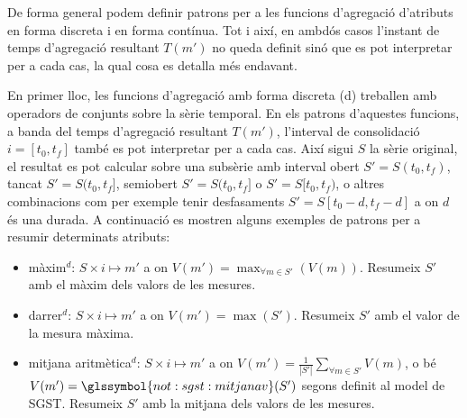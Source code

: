De forma general podem definir patrons per a les funcions d'agregació
d'atributs en forma discreta i en forma contínua. Tot i així, en
ambdós casos l'instant de temps d'agregació resultant $T(m')$ no queda
definit sinó que es pot interpretar per a cada cas, la qual cosa es detalla
més endavant.


En primer lloc, les funcions d'agregació amb forma discreta (d)
treballen amb operadors de conjunts sobre la sèrie temporal. En els
patrons d'aquestes funcions, a banda del temps d'agregació resultant
$T(m')$, l'interval de consolidació $i=[t_0,t_f]$ també es pot
interpretar per a cada cas. Així sigui $S$ la sèrie original, el
resultat es pot calcular sobre una subsèrie amb interval obert
$S'=S(t_0,t_f)$, tancat $S'=S(t_0,t_f]$, semiobert $S'=S(t_0,t_f]$ o
$S'=S[t_0,t_f)$, o altres combinacions com per exemple tenir
desfasaments $S'=S[t_0-d,t_f-d]$ a on $d$ és una durada. A continuació
es mostren alguns exemples de patrons per a resumir determinats
atributs:
\begin{itemize}
\item màxim$^d$: $S \times i \mapsto m'$ a on $V(m') = \max_{\forall m
    \in S'}(V(m))$. Resumeix $S'$ amb el màxim dels valors de les
  mesures.


\item darrer$^d$: $S \times i \mapsto m'$ a on $V(m') =
  \max(S')$. Resumeix $S'$ amb el valor de la mesura màxima.
\item mitjana aritmètica$^d$: $S \times i \mapsto m'$ a on $V(m') =
  \frac{1}{|S'|} \sum\limits_{\forall m\in S'} V(m)$, o bé $V(m') =
  \glssymbol{not:sgst:mitjanav}(S')$ segons definit al model de
  SGST. Resumeix $S'$ amb la mitjana dels valors de les mesures.
\end{itemize}


